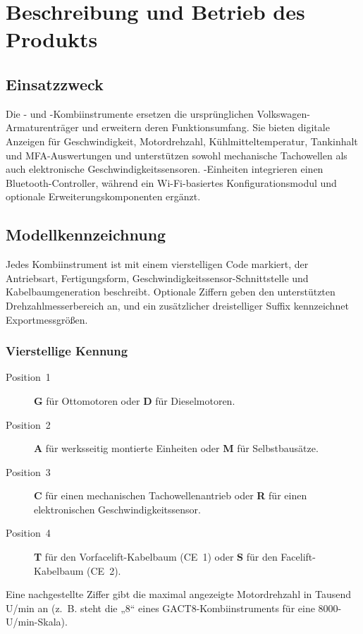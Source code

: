 \chapter{Beschreibung und Betrieb des Produkts}\label{ch:description}

\section{Einsatzzweck}
Die \ReplicaGenOne{}- und \ReplicaNextLong{}-Kombiinstrumente ersetzen die ursprünglichen Volkswagen-Armaturenträger und erweitern deren Funktionsumfang. Sie bieten digitale Anzeigen für Geschwindigkeit, Motordrehzahl, Kühlmitteltemperatur, Tankinhalt und MFA-Auswertungen und unterstützen sowohl mechanische Tachowellen als auch elektronische Geschwindigkeitssensoren. \ReplicaGenOneShort{}-Einheiten integrieren einen Bluetooth-Controller, während \ReplicaNextShort{} ein Wi-Fi-basiertes Konfigurationsmodul und optionale Erweiterungskomponenten ergänzt.

\section{Modellkennzeichnung}
Jedes Kombiinstrument ist mit einem vierstelligen Code markiert, der Antriebsart, Fertigungsform, Geschwindigkeitssensor-Schnittstelle und Kabelbaumgeneration beschreibt. Optionale Ziffern geben den unterstützten Drehzahlmesserbereich an, und ein zusätzlicher dreistelliger Suffix kennzeichnet Exportmessgrößen.

\subsection{Vierstellige Kennung}
\begin{description}
    \item[Position~1] \textbf{G} für Ottomotoren oder \textbf{D} für Dieselmotoren.
    \item[Position~2] \textbf{A} für werksseitig montierte Einheiten oder \textbf{M} für Selbstbausätze.
    \item[Position~3] \textbf{C} für einen mechanischen Tachowellenantrieb oder \textbf{R} für einen elektronischen Geschwindigkeitssensor.
    \item[Position~4] \textbf{T} für den Vorfacelift-Kabelbaum (CE~1) oder \textbf{S} für den Facelift-Kabelbaum (CE~2).
\end{description}
Eine nachgestellte Ziffer gibt die maximal angezeigte Motordrehzahl in Tausend U/min an (z.~B. steht die „8“ eines GACT8-Kombiinstruments für eine 8000-U/min-Skala).


